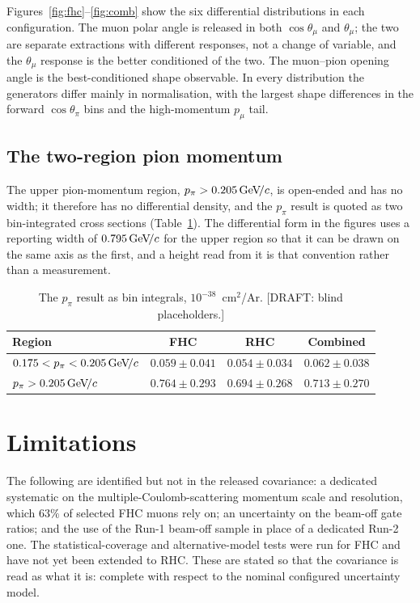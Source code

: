 \documentclass[aps,prd,twocolumn,superscriptaddress,nofootinbib,floatfix]{revtex4-2}
\begin{document}
Figures~\ref{fig:fhc}--\ref{fig:comb} show the six differential distributions in each
configuration. The muon polar angle is released in both $\cos\theta_\mu$ and $\theta_\mu$; the
two are separate extractions with different responses, not a change of variable, and the
$\theta_\mu$ response is the better conditioned of the two. The muon--pion opening angle is the
best-conditioned shape observable. In every distribution the generators differ mainly in
normalisation, with the largest shape differences in the forward $\cos\theta_\pi$ bins and the
high-momentum $p_\mu$ tail.

\subsection{The two-region pion momentum}

The upper pion-momentum region, $p_\pi>0.205\,\text{GeV}\!/c$, is open-ended and has no width; it therefore
has no differential density, and the $p_\pi$ result is quoted as two bin-integrated cross
sections (Table~\ref{tab:ppi}). The differential form in the figures uses a reporting width of
$0.795\,\text{GeV}\!/c$ for the upper region so that it can be drawn on the same axis as the first, and a
height read from it is that convention rather than a measurement.

\begin{table}[t]
  \caption{The $p_\pi$ result as bin integrals, $10^{-38}$~cm$^2$/Ar. [DRAFT: blind placeholders.]}
  \label{tab:ppi}
  \begin{ruledtabular}
  \begin{tabular}{lccc}
    Region & FHC & RHC & Combined \\
    \hline
    $0.175<p_\pi<0.205\,\text{GeV}\!/c$ & $0.059\pm0.041$ & $0.054\pm0.034$ & $0.062\pm0.038$ \\
    $p_\pi>0.205\,\text{GeV}\!/c$ & $0.764\pm0.293$ & $0.694\pm0.268$ & $0.713\pm0.270$ \\
  \end{tabular}
  \end{ruledtabular}
\end{table}

\section{Limitations}
\label{sec:limitations}

The following are identified but not in the released covariance: a dedicated systematic on the
multiple-Coulomb-scattering momentum scale and resolution, which $63\%$ of selected FHC muons rely
on; an uncertainty on the beam-off gate ratios; and the use of the Run-1 beam-off sample in place
of a dedicated Run-2 one. The statistical-coverage and alternative-model tests were run for FHC and
have not yet been extended to RHC. These are stated so that the covariance is read as what it is:
complete with respect to the nominal configured uncertainty model.
\end{document}
